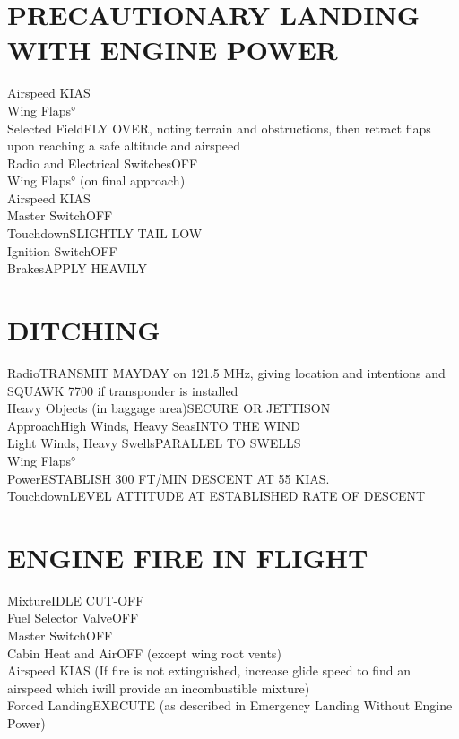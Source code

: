 \documentclass{article}
\begin{document}
\begin{multicols*}{2}
\section*{PRECAUTIONARY LANDING WITH ENGINE POWER}
Airspeed KIAS\\
Wing Flaps°\\
Selected Field\dotfill FLY OVER, noting terrain and obstructions, then retract flaps upon reaching a safe altitude and airspeed\\
Radio and Electrical Switches\dotfill OFF\\
Wing Flaps° (on final approach)\\
Airspeed KIAS\\
Master Switch\dotfill OFF\\
Touchdown\dotfill SLIGHTLY TAIL LOW\\
Ignition Switch\dotfill OFF\\
Brakes\dotfill  APPLY HEAVILY
\section*{DITCHING}
Radio\dotfill TRANSMIT MAYDAY on 121.5 MHz, giving location and intentions and SQUAWK 7700 if transponder is installed\\
Heavy Objects (in baggage area)\dotfill SECURE OR JETTISON\\
Approach\dotfill High Winds, Heavy Seas\dotfill INTO THE WIND\\
\hspace*{6mm}Light Winds, Heavy Swells\dotfill PARALLEL TO SWELLS\\
Wing Flaps°\\
Power\dotfill ESTABLISH 300 FT/MIN DESCENT AT 55 KIAS.\\
Touchdown\dotfill LEVEL ATTITUDE AT ESTABLISHED RATE OF DESCENT
\section*{ENGINE FIRE IN FLIGHT}
Mixture\dotfill IDLE CUT-OFF\\
Fuel Selector Valve\dotfill OFF\\
Master Switch\dotfill OFF\\
Cabin Heat and Air\dotfill OFF (except wing root vents)\\
Airspeed KIAS (If fire is not extinguished, increase glide speed to find an airspeed which iwill provide an incombustible mixture)\\
Forced Landing\dotfill EXECUTE (as described in Emergency Landing Without Engine Power)

\end{multicols*}
\end{document}

